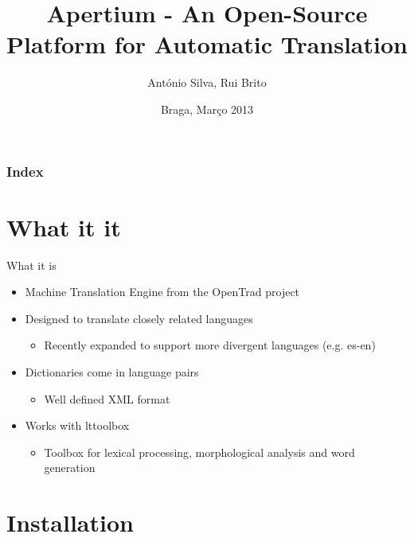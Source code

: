 \documentclass{beamer}
\title{Apertium - An Open-Source Platform for Automatic Translation}
\author{António Silva, Rui Brito}
\institute[pg22820, pg22781]{
	Universidade do Minho
}
\date{Braga, Março 2013}
\begin{document}

\maketitle%

\begin{frame}
	\frametitle{Index}
	\tableofcontents
\end{frame}

\section{What it it}
\begin{frame}
	\begin{block}{What it is}
		\begin{itemize}
			\item Machine Translation Engine from the OpenTrad project			
			\item Designed to translate closely related languages
			\begin{itemize}
				\item Recently expanded to support more divergent languages (e.g. es-en)
			\end{itemize}
			\item Dictionaries come in language pairs
			\begin{itemize}
				\item Well defined XML format
			\end{itemize}
			\item Works with lttoolbox
				\begin{itemize}
					\item Toolbox for lexical processing, morphological analysis and word generation
			\end{itemize}
		\end{itemize}
	\end{block}
\end{frame}

\section{Installation}
\end{document}
